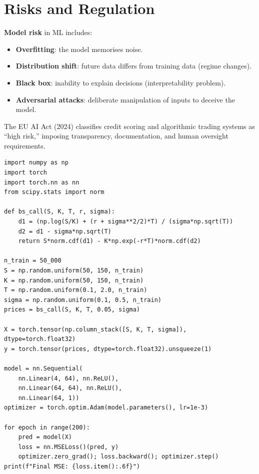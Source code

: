 \section{Risks and Regulation}

\begin{definition}
\textbf{Model risk} in ML includes:
\begin{itemize}
    \item \textbf{Overfitting}: the model memorises noise.
    \item \textbf{Distribution shift}: future data differs from training data
    (regime changes).
    \item \textbf{Black box}: inability to explain decisions
    (interpretability problem).
    \item \textbf{Adversarial attacks}: deliberate manipulation of inputs to
    deceive the model.
\end{itemize}
\end{definition}

\begin{remark}
The EU AI Act (2024) classifies credit scoring and algorithmic trading systems
as ``high risk,'' imposing transparency, documentation, and human oversight
requirements.
\end{remark}

\begin{codeblock}[title=\textbf{Option pricing with a neural network}]
\begin{verbatim}
import numpy as np
import torch
import torch.nn as nn
from scipy.stats import norm

def bs_call(S, K, T, r, sigma):
    d1 = (np.log(S/K) + (r + sigma**2/2)*T) / (sigma*np.sqrt(T))
    d2 = d1 - sigma*np.sqrt(T)
    return S*norm.cdf(d1) - K*np.exp(-r*T)*norm.cdf(d2)

n_train = 50_000
S = np.random.uniform(50, 150, n_train)
K = np.random.uniform(50, 150, n_train)
T = np.random.uniform(0.1, 2.0, n_train)
sigma = np.random.uniform(0.1, 0.5, n_train)
prices = bs_call(S, K, T, 0.05, sigma)

X = torch.tensor(np.column_stack([S, K, T, sigma]), dtype=torch.float32)
y = torch.tensor(prices, dtype=torch.float32).unsqueeze(1)

model = nn.Sequential(
    nn.Linear(4, 64), nn.ReLU(),
    nn.Linear(64, 64), nn.ReLU(),
    nn.Linear(64, 1))
optimizer = torch.optim.Adam(model.parameters(), lr=1e-3)

for epoch in range(200):
    pred = model(X)
    loss = nn.MSELoss()(pred, y)
    optimizer.zero_grad(); loss.backward(); optimizer.step()
print(f"Final MSE: {loss.item():.6f}")
\end{verbatim}
\end{codeblock}

